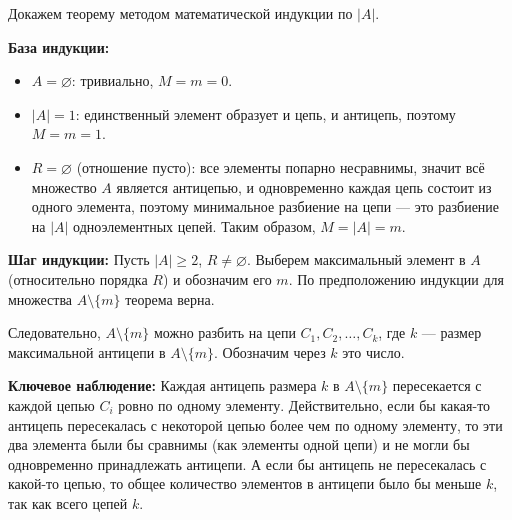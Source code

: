 \documentclass[a4paper,12pt]{article}
\begin{document}
	Докажем теорему методом математической индукции по $|A|$.
	
	\textbf{База индукции:} 
	\begin{itemize}
		\item $A = \varnothing$: тривиально, $M = m = 0$.
		\item $|A| = 1$: единственный элемент образует и цепь, и антицепь, поэтому $M = m = 1$.
		\item $R = \varnothing$ (отношение пусто): все элементы попарно несравнимы, значит всё множество $A$ является антицепью, и одновременно каждая цепь состоит из одного элемента, поэтому минимальное разбиение на цепи — это разбиение на $|A|$ одноэлементных цепей. Таким образом, $M = |A| = m$.
	\end{itemize}
	
	\textbf{Шаг индукции:} Пусть $|A| \ge 2$, $R \neq \varnothing$. Выберем максимальный элемент в $A$ (относительно порядка $R$) и обозначим его $m$. По предположению индукции для множества $A \setminus \{m\}$ теорема верна.
	
	Следовательно, $A \setminus \{m\}$ можно разбить на цепи $C_1, C_2, \dots, C_k$, где $k$ — размер максимальной антицепи в $A \setminus \{m\}$. Обозначим через $k$ это число.
	
	\begin{center}
	\end{center}
	
	\textbf{Ключевое наблюдение:} Каждая антицепь размера $k$ в $A \setminus \{m\}$ пересекается с каждой цепью $C_i$ ровно по одному элементу. Действительно, если бы какая-то антицепь пересекалась с некоторой цепью более чем по одному элементу, то эти два элемента были бы сравнимы (как элементы одной цепи) и не могли бы одновременно принадлежать антицепи. А если бы антицепь не пересекалась с какой-то цепью, то общее количество элементов в антицепи было бы меньше $k$, так как всего цепей $k$.
	
\end{document}

